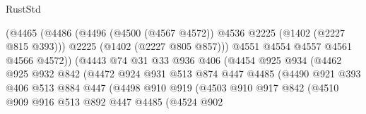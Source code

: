 \begin{lexlean}{RustStd}
\begin{coremodule}
                                (@4465
                                  (@4486
                                    (@4496
                                      (@4500 (@4567 @4572))
                                      @4536
                                      @2225
                                      (@1402 (@2227 @815 @393)))
                                    @2225
                                    (@1402 (@2227 @805 @857)))
                                  @4551
                                  @4554
                                  @4557
                                  @4561
                                  @4566
                                  @4572))
                              (@4443
                                @74
                                @31
                                @33
                                @936
                                @406
                                (@4454
                                  @925
                                  @934
                                  (@4462
                                    @925
                                    @932
                                    @842
                                    (@4472
                                      @924
                                      @931
                                      @513
                                      @874
                                      @447
                                      @4485
                                      (@4490
                                        @921
                                        @393
                                        @406
                                        @513
                                        @884
                                        @447
                                        (@4498
                                          @910
                                          @919
                                          (@4503
                                            @910
                                            @917
                                            @842
                                            (@4510
                                              @909
                                              @916
                                              @513
                                              @892
                                              @447
                                              @4485
                                              (@4524
                                                @902

\end{coremodule}
\end{lexlean}
